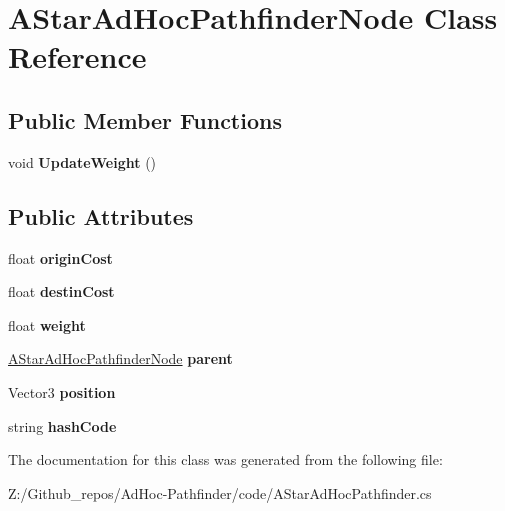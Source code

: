 \hypertarget{class_a_star_ad_hoc_pathfinder_node}{\section{A\+Star\+Ad\+Hoc\+Pathfinder\+Node Class Reference}
\label{class_a_star_ad_hoc_pathfinder_node}
}
\subsection*{Public Member Functions}
\begin{DoxyCompactItemize}
\item 
\hypertarget{class_a_star_ad_hoc_pathfinder_node_a2718609f883d9975f8b4fbd9f95a6412}{void {\bfseries Update\+Weight} ()}\label{class_a_star_ad_hoc_pathfinder_node_a2718609f883d9975f8b4fbd9f95a6412}

\end{DoxyCompactItemize}
\subsection*{Public Attributes}
\begin{DoxyCompactItemize}
\item 
\hypertarget{class_a_star_ad_hoc_pathfinder_node_a6c2f4394cbf3eb9ea30fb72d4c6a4ebb}{float {\bfseries origin\+Cost}}\label{class_a_star_ad_hoc_pathfinder_node_a6c2f4394cbf3eb9ea30fb72d4c6a4ebb}

\item 
\hypertarget{class_a_star_ad_hoc_pathfinder_node_a5a2bec42c2855c8cbc3e6df3224dd775}{float {\bfseries destin\+Cost}}\label{class_a_star_ad_hoc_pathfinder_node_a5a2bec42c2855c8cbc3e6df3224dd775}

\item 
\hypertarget{class_a_star_ad_hoc_pathfinder_node_ae1b9e6c89f4b1a9d2a12b5a5e520fc80}{float {\bfseries weight}}\label{class_a_star_ad_hoc_pathfinder_node_ae1b9e6c89f4b1a9d2a12b5a5e520fc80}

\item 
\hypertarget{class_a_star_ad_hoc_pathfinder_node_a4a628a1213b57baff66fbdfe5ddfa888}{\hyperlink{class_a_star_ad_hoc_pathfinder_node}{A\+Star\+Ad\+Hoc\+Pathfinder\+Node} {\bfseries parent}}\label{class_a_star_ad_hoc_pathfinder_node_a4a628a1213b57baff66fbdfe5ddfa888}

\item 
\hypertarget{class_a_star_ad_hoc_pathfinder_node_a09cfa2bf7fe21191830e9fe1369c6479}{Vector3 {\bfseries position}}\label{class_a_star_ad_hoc_pathfinder_node_a09cfa2bf7fe21191830e9fe1369c6479}

\item 
\hypertarget{class_a_star_ad_hoc_pathfinder_node_ad0ce5befc74dcd258bb915974da520f8}{string {\bfseries hash\+Code}}\label{class_a_star_ad_hoc_pathfinder_node_ad0ce5befc74dcd258bb915974da520f8}

\end{DoxyCompactItemize}


The documentation for this class was generated from the following file\+:\begin{DoxyCompactItemize}
\item 
Z\+:/\+Github\+\_\+repos/\+Ad\+Hoc-\/\+Pathfinder/code/A\+Star\+Ad\+Hoc\+Pathfinder.\+cs\end{DoxyCompactItemize}
